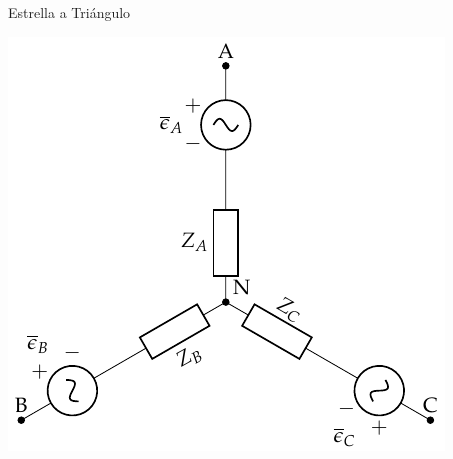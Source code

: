 \documentclass[aspectratio=169, usenames,svgnames,dvipsnames]{beamer}
\begin{document}
\begin{frame}[label={sec:orgedd06b4}]{Estrella a Triángulo}
\begin{center}
\includegraphics[height=0.9\textheight]{../figs/GeneradorRealEstrella.pdf}
\end{center}
\end{frame}
\end{document}
